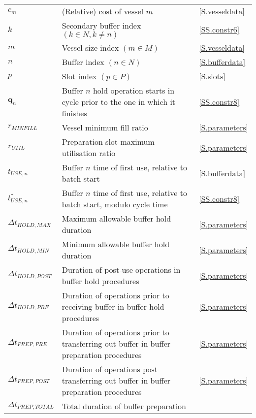 {\begin{longtabu} to 
     &  & \\\hline
    \endhead
    $c_{m}$ & (Relative) cost of vessel $m$ & \ref{S.vesseldata}\\
    $k$ & Secondary buffer index $\left( k \in N, k \ne n \right)$
        & \ref{SS.constr6}\\
    $m$ & Vessel size index $\left( m \in M \right)$ & \ref{S.vesseldata}\\
    $n$ & Buffer index $\left( n \in N \right)$ & \ref{S.bufferdata}\\
    $p$ & Slot index $\left( p \in P \right)$ & \ref{S.slots}\\
    $\boldsymbol{q}_{n}$ & Buffer $n$ hold operation starts in cycle prior to
        the one in which it finishes & \ref{SS.constr8}\\
    $r_{\mathit{MINFILL}}$ & Vessel minimum fill ratio & \ref{S.parameters}\\
    $r_{\mathit{UTIL}}$ & Preparation slot maximum utilisation ratio
        & \ref{S.parameters}\\
    $t_{\mathit{USE},n}$ & Buffer $n$ time of first use, relative to batch
        start & \ref{S.bufferdata}\\
    $t_{\mathit{USE},n}^{*}$ & Buffer $n$ time of first use, relative to batch
        start, modulo cycle time & \ref{SS.constr8}\\
    $\Delta t_{\mathit{HOLD,MAX}}$ & Maximum allowable buffer hold duration
        & \ref{S.parameters}\\
    $\Delta t_{\mathit{HOLD,MIN}}$ & Minimum allowable buffer hold duration
        & \ref{S.parameters}\\
    $\Delta t_{\mathit{HOLD,POST}}$ & Duration of post-use operations in buffer
        hold procedures & \ref{S.parameters}\\
    $\Delta t_{\mathit{HOLD,PRE}}$ & Duration of operations prior to receiving
        buffer in buffer hold procedures & \ref{S.parameters}\\
    $\Delta t_{\mathit{PREP,PRE}}$ & Duration of operations prior to
        transferring out buffer in buffer preparation procedures & 
        \ref{S.parameters}\\
    $\Delta t_{\mathit{PREP,POST}}$ & Duration of operations post transferring
        out buffer in buffer preparation procedures & \ref{S.parameters}\\
    $\Delta t_{\mathit{PREP,TOTAL}}$ & Total duration of buffer preparation

\end{longtabu}}
